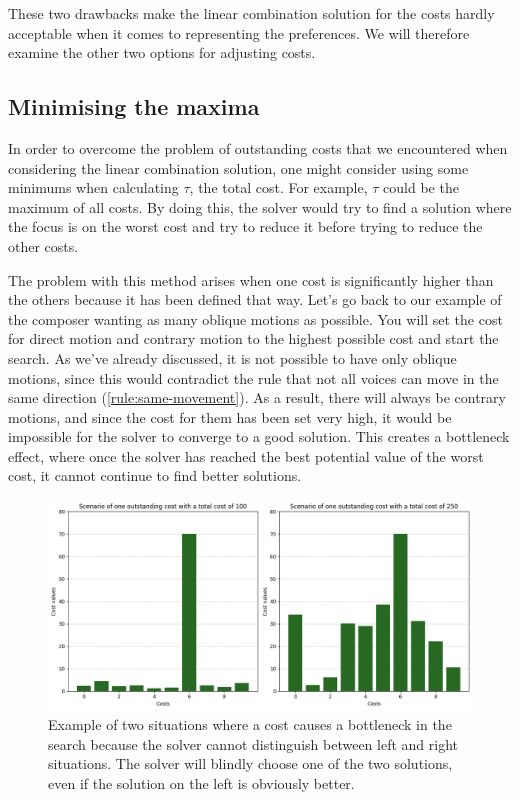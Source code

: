 These two drawbacks make the linear combination solution for the costs hardly acceptable when it comes to representing the preferences.
We will therefore examine the other two options for adjusting costs.

\subsection {Minimising the maxima} \label{section:minimising-the-maxima}
In order to overcome the problem of outstanding costs that we encountered when considering the linear combination solution, one might consider using some minimums when calculating $\tau$, the total cost. For example, $\tau$ could be the maximum of all costs. By doing this, the solver would try to find a solution where the focus is on the worst cost and try to reduce it before trying to reduce the other costs.

The problem with this method arises when one cost is significantly higher than the others because it has been defined that way. Let's go back to our example of the composer wanting as many oblique motions as possible. You will set the cost for direct motion and contrary motion to the highest possible cost and start the search. As we've already discussed, it is not possible to have only oblique motions, since this would contradict the rule that not all voices can move in the same direction (\ref{rule:same-movement}). As a result, there will always be contrary motions, and since the cost for them has been set very high, it would be impossible for the solver to converge to a good solution. This creates a bottleneck effect, where once the solver has reached the best potential value of the worst cost, it cannot continue to find better solutions. 

\begin{figure}[h]
    \centering
    \includegraphics[width=1\textwidth]{Images/minimising-maxima.png}
    \caption{Example of two situations where a cost causes a bottleneck in the search because the solver cannot distinguish between left and right situations. The solver will blindly choose one of the two solutions, even if the solution on the left is obviously better.}
    \label{fig:bottleneck}
\end{figure}


